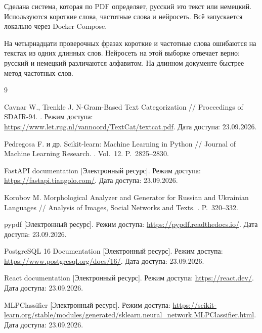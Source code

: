 
Сделана система, которая по PDF определяет, русский это текст или немецкий. Используются короткие слова, частотные слова и нейросеть. Всё запускается локально через Docker Compose.

На четырнадцати проверочных фразах короткие и частотные слова ошибаются на текстах из одних длинных слов. Нейросеть на этой выборке отвечает верно: русский и немецкий различаются алфавитом. На длинном документе быстрее метод частотных слов.

\begin{thebibliography}{9}

	Cavnar W., Trenkle J. N-Gram-Based Text Categorization // Proceedings of SDAIR-94. . \mdash Режим доступа: \url{https://www.let.rug.nl/vannoord/TextCat/textcat.pdf}. \mdash Дата доступа: 23.09.2026.

	Pedregosa F. и др. Scikit-learn: Machine Learning in Python // Journal of Machine Learning Research. . \mdash Vol.~12. \mdash P.~2825--2830.

	FastAPI documentation [Электронный ресурс]. \mdash Режим доступа: \url{https://fastapi.tiangolo.com/}. \mdash Дата доступа: 23.09.2026.

	Korobov M. Morphological Analyzer and Generator for Russian and Ukrainian Languages // Analysis of Images, Social Networks and Texts. . \mdash P.~320--332.

	pypdf [Электронный ресурс]. \mdash Режим доступа: \url{https://pypdf.readthedocs.io/}. \mdash Дата доступа: 23.09.2026.

	PostgreSQL 16 Documentation [Электронный ресурс]. \mdash Режим доступа: \url{https://www.postgresql.org/docs/16/}. \mdash Дата доступа: 23.09.2026.

	React documentation [Электронный ресурс]. \mdash Режим доступа: \url{https://react.dev/}. \mdash Дата доступа: 23.09.2026.

	MLPClassifier [Электронный ресурс]. \mdash Режим доступа: \url{https://scikit-learn.org/stable/modules/generated/sklearn.neural_network.MLPClassifier.html}. \mdash Дата доступа: 23.09.2026.
\end{thebibliography}
